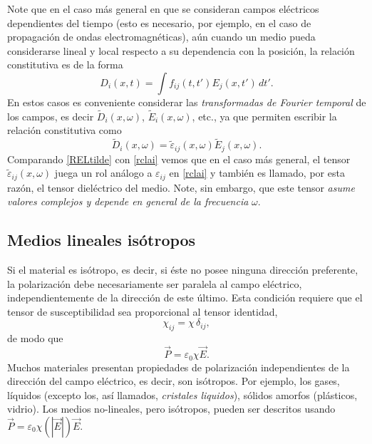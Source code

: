 Note que en el caso más general en que se consideran campos eléctricos dependientes del tiempo (esto es necesario, por ejemplo, en el caso de propagación de ondas electromagnéticas), aún cuando un medio pueda considerarse lineal y local respecto a su dependencia con la posición, la relación constitutiva es de la forma
\begin{equation}
D_i(x,t)=\int f_{ij}(t,t')E_j(x,t')\,dt'.
\end{equation}
En estos casos es conveniente considerar las \textit{transformadas de Fourier temporal} de los campos, es decir $\tilde{D}_i(x,\omega)$, $\tilde{E}_i(x,\omega)$, etc., ya que permiten escribir la relación constitutiva como
\begin{equation}\label{RELtilde}
\tilde{D}_i(x,\omega)=\tilde{\varepsilon}_{ij}(x,\omega)\tilde{E}_j(x,\omega). 
\end{equation}
Comparando \eqref{RELtilde} con \eqref{rclai} vemos que en el caso más general, el tensor $\tilde{\varepsilon}_{ij}(x,\omega)$ juega un rol análogo a $\varepsilon_{ij}$ en \eqref{rclai} y también es llamado, por esta razón, el tensor dieléctrico del medio. Note, sin embargo, que este tensor \textit{asume valores complejos y depende en general de la frecuencia} $\omega$.


\subsection{Medios lineales isótropos}\label{sec:iso}
Si el material es isótropo, es decir, si éste no posee ninguna dirección
preferente, la polarización debe necesariamente ser paralela al campo
eléctrico, independientemente de la dirección de este último. Esta condición requiere que el tensor de susceptibilidad sea proporcional al tensor identidad,
\begin{equation}
\chi_{ij}=\chi\,\delta_{ij},
\end{equation}
de modo que
\begin{equation}
\vec{P}=\varepsilon_0\chi\vec{E}.
\end{equation}
Muchos materiales presentan propiedades de polarización independientes de
la dirección del campo eléctrico, es decir, son isótropos. Por ejemplo, los
gases, líquidos (excepto los, así llamados, \textit{cristales liquidos}), sólidos amorfos (plásticos, vidrio).
Los medios no-lineales, pero isótropos, pueden ser descritos usando
$\vec{P}=\varepsilon_0\chi(|\vec{E}|)\vec{E}$.

